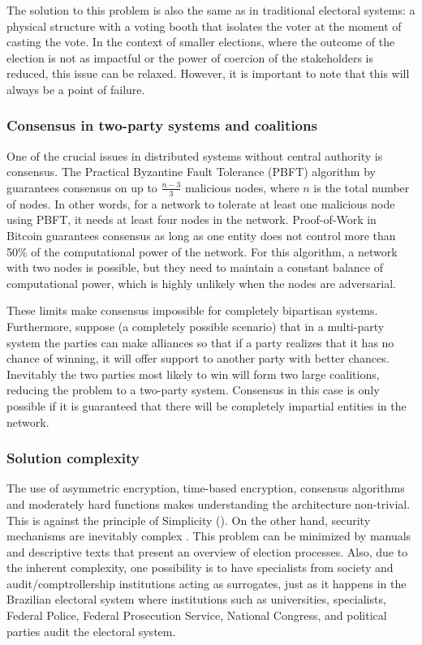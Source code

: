 \documentclass[english]{textolivre}
\begin{document}
The solution to this problem is also the same as in traditional electoral systems: a physical structure with a voting booth that isolates the voter at the moment of casting the vote. In the context of smaller elections, where the outcome of the election is not as impactful or the power of coercion of the stakeholders is reduced, this issue can be relaxed. However, it is important to note that this will always be a point of failure.

\subsubsection{Consensus in two-party systems and coalitions}

One of the crucial issues in distributed systems without central authority is consensus. The Practical Byzantine Fault Tolerance (PBFT) algorithm by \textcite{liskov} guarantees consensus on up to $\frac{n-3}{3}$ malicious nodes, where $n$ is the total number of nodes. In other words, for a network to tolerate at least one malicious node using PBFT, it needs at least four nodes in the network. Proof-of-Work in Bitcoin guarantees consensus as long as one entity does not control more than 50\% of the computational power of the network. For this algorithm, a network with two nodes is possible, but they need to maintain a constant balance of computational power, which is highly unlikely when the nodes are adversarial.

These limits make consensus impossible for completely bipartisan systems. Furthermore, suppose (a completely possible scenario) that in a multi-party system the parties can make alliances so that if a party realizes that it has no chance of winning, it will offer support to another party with better chances. Inevitably the two parties most likely to win will form two large coalitions, reducing the problem to a two-party system. Consensus in this case is only possible if it is guaranteed that there will be completely impartial entities in the network.

\subsubsection{Solution complexity}

The use of asymmetric encryption, time-based encryption, consensus algorithms and moderately hard functions makes understanding the architecture non-trivial. This is against the principle of Simplicity (). On the other hand, security mechanisms are inevitably complex \cite{stallings}. This problem can be minimized by manuals and descriptive texts that present an overview of election processes. Also, due to the inherent complexity, one possibility is to have specialists from society and audit/comptrollership institutions acting as surrogates, just as it happens in the Brazilian electoral system where institutions such as universities, specialists, Federal Police, Federal Prosecution Service, National Congress, and political parties audit the electoral system.
\end{document}
